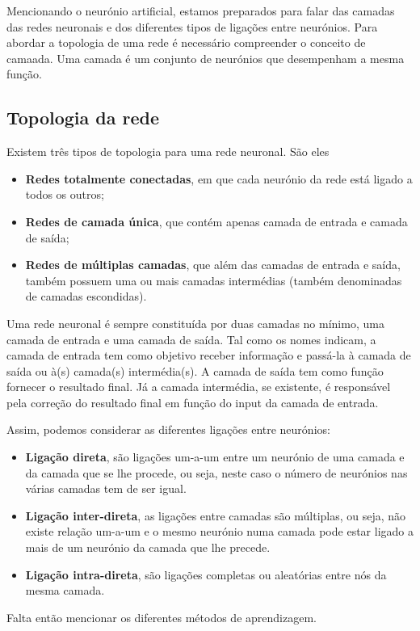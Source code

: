 \documentclass[10pt,a4paper]{article}
\begin{document}
 Mencionando o neurónio artificial, estamos preparados para falar das camadas das redes neuronais e dos diferentes tipos de ligações entre neurónios.
 Para abordar a topologia de uma rede é necessário compreender o conceito de camaada. Uma camada é um conjunto de neurónios que desempenham a mesma função.
 
 \subsection{Topologia da rede}
 Existem três tipos de topologia para uma rede neuronal. São eles
 \begin{itemize}
 \item \textbf{Redes totalmente conectadas}, em que cada neurónio da rede está ligado a todos os outros;
 \item \textbf{Redes de camada única}, que contém apenas camada de entrada e camada de saída;
 \item \textbf{Redes de múltiplas camadas}, que além das camadas de entrada e saída, também possuem uma ou mais camadas intermédias (também denominadas de camadas escondidas).
 \end{itemize}
 
 
 Uma rede neuronal é sempre constituída por duas camadas no mínimo, uma camada de entrada e uma camada de saída. Tal como os nomes indicam, a camada de entrada tem como objetivo receber informação e passá-la à camada de saída ou à(s) camada(s) intermédia(s). A camada de saída tem como função fornecer o resultado final. Já a camada intermédia, se existente, é responsável pela correção do resultado final em função do input da camada de entrada.
 
 Assim, podemos considerar as diferentes ligações entre neurónios:
 \begin{itemize}
 \item \textbf{Ligação direta}, são ligações um-a-um entre um neurónio de uma camada e da camada que se lhe procede, ou seja, neste caso o número de neurónios nas várias camadas tem de ser igual.
 \item \textbf{Ligação inter-direta}, as ligações entre camadas são múltiplas, ou seja, não existe relação um-a-um e o mesmo neurónio numa camada pode estar ligado a mais de um neurónio da camada que lhe precede.
 \item \textbf{Ligação intra-direta}, são ligações completas ou aleatórias entre nós da mesma camada.
 \end{itemize}
 
 Falta então mencionar os diferentes métodos de aprendizagem.
 
\end{document}
